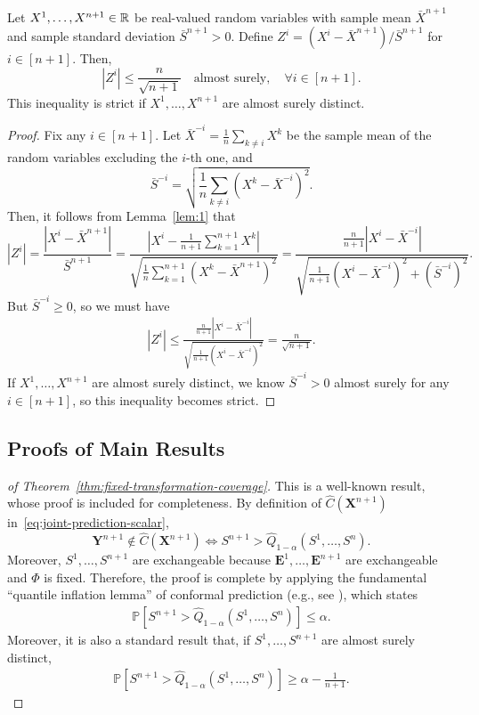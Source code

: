 \begin{lemma}\label{lem:3}
    Let $X^1,\ldots, X^{n+1} \in \mathbb{R}$ be real-valued random variables with sample mean $\bar{X}^{n+1}$ and sample standard deviation $\bar{S}^{n+1} > 0$. Define $Z^i = (X^i-\bar{X}^{n+1}) / \bar{S}^{n+1}$ for $i \in [n+1]$. Then,
    \[
    |Z^i| \leq \frac{n}{\sqrt{n+1}} \quad\text{almost surely}, \quad \forall i \in [n+1].
    \]
    This inequality is strict if $X^1,\ldots,X^{n+1}$ are almost surely distinct.
\end{lemma}
\begin{proof}
Fix any $i\in [n+1]$.
Let $\bar{X}^{-i} = \frac{1}{n}\sum_{k\neq i}X^k$ be the sample mean of the random variables excluding the $i$-th one, and
\[
\bar{S}^{-i} = \sqrt{\frac{1}{n}\sum_{k\neq i}(X^k - \bar{X}^{-i})^2}.
\]
Then, it follows from Lemma~\ref{lem:1} that
\[
|Z^i| = \frac{|X^i-\bar{X}^{n+1}|}{\bar{S}^{n+1}}
    = \frac{\left|X^i - \frac{1}{n+1}\sum^{n+1}_{k=1}X^k\right|}{\sqrt{\frac{1}{n}\sum^{n+1}_{k=1}(X^k - \bar{X}^{n+1})^2}}=\frac{\frac{n}{n+1}|X^i - \bar{X}^{-i}|}{\sqrt{\frac{1}{n+1}(X^i-\bar{X}^{-i})^2+(\bar{S}^{-i})^2}}.
\]
But $\bar{S}^{-i} \geq 0$, so we must have
\begin{align*}
    |Z^i|\leq \frac{\frac{n}{n+1}|X^i - \bar{X}^{-i}|}{\sqrt{\frac{1}{n+1}(X^i-\bar{X}^{-i})^2}}= \frac{n}{\sqrt{n+1}}.
\end{align*}
If $X^1,\ldots,X^{n+1}$ are almost surely distinct, we know $\bar{S}^{-i} >0$ almost surely for any $i \in [n+1]$, so this inequality becomes strict.
\end{proof}


\subsection{Proofs of Main Results}
\label{app:proofs-thms}

\begin{proof}[of Theorem~\ref{thm:fixed-transformation-coverage}]
This is a well-known result, whose proof is included for completeness. 
By definition of $\hat{C}(\mathbf{X}^{n+1})$ in~\eqref{eq:joint-prediction-scalar},
\[
 \mathbf{Y}^{n+1} \notin \hat{C}(\mathbf{X}^{n+1}) \Longleftrightarrow S^{n+1} > \hat{Q}_{1-\alpha}(S^1,\ldots,S^n).
\]
Moreover, $S^1,\ldots,S^{n+1}$ are exchangeable because $\mathbf{E}^1,\ldots,\mathbf{E}^{n+1}$ are exchangeable and $\Phi$ is fixed.
Therefore, the proof is complete by applying the fundamental ``quantile inflation lemma'' of conformal prediction (e.g., see \citet{angelopoulos2025theoreticalfoundationsconformalprediction}), which states 
\begin{align*}
  \mathbb{P}\left[ S^{n+1} > \hat{Q}_{1-\alpha}(S^1,\ldots,S^n) \right] \leq \alpha.
\end{align*}
Moreover, it is also a standard result that, if $S^1,\ldots,S^{n+1}$ are almost surely distinct,
\begin{align*}
  \mathbb{P}\left[ S^{n+1} > \hat{Q}_{1-\alpha}(S^1,\ldots,S^n) \right] \geq \alpha - \frac{1}{n+1}.
\end{align*}
\end{proof}

